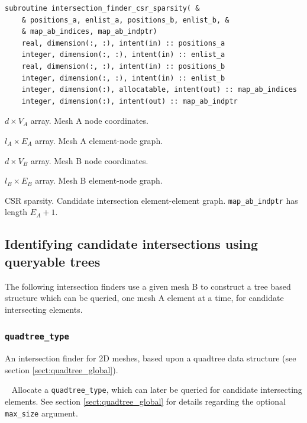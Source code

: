 \documentclass{article}
\begin{document}
\begin{lstlisting}[language=FORTRAN]
  subroutine intersection_finder_csr_sparsity( &
    & positions_a, enlist_a, positions_b, enlist_b, &
    & map_ab_indices, map_ab_indptr)
    real, dimension(:, :), intent(in) :: positions_a
    integer, dimension(:, :), intent(in) :: enlist_a
    real, dimension(:, :), intent(in) :: positions_b
    integer, dimension(:, :), intent(in) :: enlist_b
    integer, dimension(:), allocatable, intent(out) :: map_ab_indices
    integer, dimension(:), intent(out) :: map_ab_indptr
\end{lstlisting}

\begin{description}[font=\ttfamily\bfseries,leftmargin=2.2\parindent,labelindent=1.7\parindent,noitemsep]
  \item[positions\_a] $d \times V_A$ array. Mesh A node coordinates.
  \item[enlist\_a] $l_A \times E_A$ array. Mesh A element-node graph.
  \item[positions\_b] $d \times V_B$ array. Mesh B node coordinates.
  \item[enlist\_b] $l_B \times E_B$ array. Mesh B element-node graph.
  \item[map\_ab\_indices, map\_ab\_indptr] CSR sparsity. Candidate intersection
    element-element graph. \linebreak \verb+map_ab_indptr+ has length $E_A + 1$.
\end{description}

\subsection{Identifying candidate intersections using queryable trees}

The following intersection finders use a given mesh B to construct a tree based
structure which can be queried, one mesh A element at a time, for candidate
intersecting elements.

\subsubsection{\texttt{quadtree\_type}}\label{sect:quadtree_query}
  
An intersection finder for 2D meshes, based upon a quadtree data structure (see
section \ref{sect:quadtree_global}).

~\newline
Allocate a \verb+quadtree_type+, which can later be queried for candidate
intersecting elements. See section \ref{sect:quadtree_global} for details
regarding the optional \verb+max_size+ argument.
\end{document}
